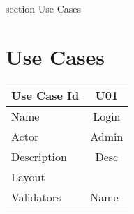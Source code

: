 

 {section} {Use Cases}
\section*{Use Cases}
\label{Use Cases}

\begin{table}[H]
\begin{tabular}{|l|c|}
\hline
Use Case Id & U01                       \\[10ex] \hline
Name        & Login                     \\ \hline
Actor       & Admin                     \\ \hline
Description & Desc                      \\ \hline
Layout      & \multicolumn{1}{l|}{}     \\ \hline
Validators  & \multicolumn{1}{l|}{Name} \\ \hline
\end{tabular}
\end{table}

\clearpage